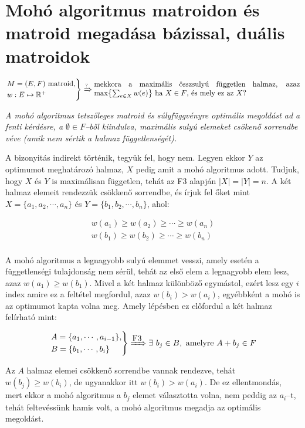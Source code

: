 \section{Mohó algoritmus matroidon és matroid megadása bázissal, duális matroidok}

\[
\begin{rcases}
M=(E,F) \mbox{ matroid}, \\ 
w : E \mapsto \mathbb{R}^+
\end{rcases}
\xRightarrow{?} \parbox[L]{9.8cm}{mekkora a maximális összsulyú független halmaz,
azaz max$\left\{\sum_{e \in X}w(e)\right\}$ ha $X \in F$, és mely ez az $X$?}
\]

\vspace{0.4cm}
\emph{A mohó algoritmus tetszőleges matroid és súlyfüggvényre optimális
megoldást ad a fenti kérdésre, a $\emptyset \in F$--ből kiindulva, maximális
sulyú elemeket csökenő sorrendbe véve (amik nem sértik a halmaz
függetlenségét).}
\vspace{0.4cm}

A bizonyitás indirekt történik, tegyük fel, hogy nem. Legyen ekkor $Y$ az
optimumot meghatározó halmaz, $X$ pedig amit a mohó algoritmus adott. Tudjuk,
hogy $X$ és $Y$ is maximálisan független, tehát az F$3$ alapján $|X|=|Y|=n$. A
két halmaz elemeit rendezzük csökkenő sorrendbe, és írjuk fel őket mint
$X=\{a_1, a_2, \cdots, a_n\}$ és $Y=\{b_1, b_2, \cdots, b_n\}$, ahol:

\begin{align*}
w(a_1) \geq w(a_2) \geq \cdots \geq w(a_n) \\
w(b_1) \geq w(b_2) \geq \cdots \geq w(b_n) \\
\end{align*}

A mohó algoritmus a legnagyobb sulyú elemmet vesszi, amely esetén a
függetlenségi tulajdonság nem sérül, tehát az első elem a legnagyobb elem lesz,
azaz $w(a_1) \geq w(b_1)$. Mivel a két halmaz különböző egymástol, ezért lesz
egy $i$ index amire ez a feltétel megfordul, azaz $ w(b_i)> w(a_i)$, egyébbként
a mohó is az optimumot kapta volna meg. Amely lépésben ez előfordul a két halmaz
felírható mint:

\[
\begin{rcases}
A=\{a_1, \cdots, a_{i-1}\}, \\
B=\{b_1, \cdots, b_{i}\}
\end{rcases} 
\xRightarrow{\mbox{F3}} \exists~b_j \in B, \mbox{ amelyre } A + b_j \in F  
\]

Az $A$ halmaz elemei csökkenő sorrendbe vannak rendezve, tehát $w(b_j) \geq
w(b_i)$, de ugyanakkor itt $w(b_i) > w(a_i)$. De ez ellentmondás, mert ekkor a
mohó algoritmus a $b_j$ elemet választotta volna, nem peddig az $a_i$--t, tehát
feltevéssünk hamis volt, a mohó algoritmus megadja az optimális megoldást.

